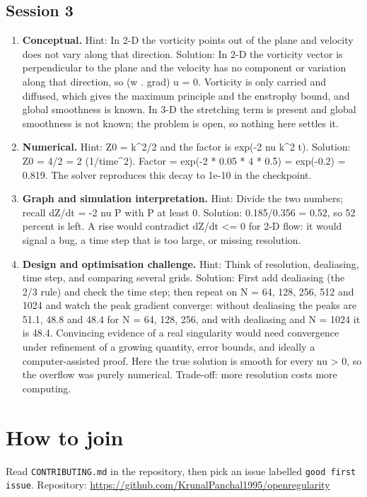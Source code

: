 \documentclass[11pt,a4paper]{article}
\begin{document}
\subsection*{Session 3}
\begin{enumerate}[nosep]
\item \textbf{Conceptual.} Hint: In 2-D the vorticity points out of the plane and velocity does not vary along that direction. Solution: In 2-D the vorticity vector is perpendicular to the plane and the velocity has no component or variation along that direction, so (w . grad) u = 0. Vorticity is only carried and diffused, which gives the maximum principle and the enstrophy bound, and global smoothness is known. In 3-D the stretching term is present and global smoothness is not known; the problem is open, so nothing here settles it.
\item \textbf{Numerical.} Hint: Z0 = k\textasciicircum{}2/2 and the factor is exp(-2 nu k\textasciicircum{}2 t). Solution: Z0 = 4/2 = 2 (1/time\textasciicircum{}2). Factor = exp(-2 * 0.05 * 4 * 0.5) = exp(-0.2) = 0.819. The solver reproduces this decay to 1e-10 in the checkpoint.
\item \textbf{Graph and simulation interpretation.} Hint: Divide the two numbers; recall dZ/dt = -2 nu P with P at least 0. Solution: 0.185/0.356 = 0.52, so 52 percent is left. A rise would contradict dZ/dt \textless{}= 0 for 2-D flow: it would signal a bug, a time step that is too large, or missing resolution.
\item \textbf{Design and optimisation challenge.} Hint: Think of resolution, dealiasing, time step, and comparing several grids. Solution: First add dealiasing (the 2/3 rule) and check the time step; then repeat on N = 64, 128, 256, 512 and 1024 and watch the peak gradient converge: without dealiasing the peaks are 51.1, 48.8 and 48.4 for N = 64, 128, 256, and with dealiasing and N = 1024 it is 48.4. Convincing evidence of a real singularity would need convergence under refinement of a growing quantity, error bounds, and ideally a computer-assisted proof. Here the true solution is smooth for every nu \textgreater{} 0, so the overflow was purely numerical. Trade-off: more resolution costs more computing.
\end{enumerate}

\section{How to join}
Read \texttt{CONTRIBUTING.md} in the repository, then pick an issue labelled \texttt{good first issue}. Repository: \url{https://github.com/KrunalPanchal1995/openregularity}
\end{document}
